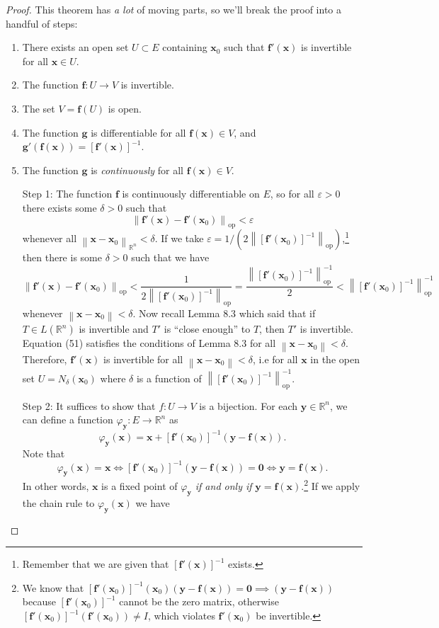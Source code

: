 \documentclass{article}
\newcommand{\R}{\mathbb{R}}
\newcommand{\x}{\mathbf{x}}
\newcommand{\f}{\mathbf{f}}
\newcommand{\y}{\mathbf{y}}
\newcommand{\ze}{\mathbf{0}}
\newcommand{\norm}[1]{\left\lVert#1\right\rVert}
\newcommand{\normop}[1]{\left\lVert#1\right\rVert_\text{op}}
\theoremstyle{definition}
\begin{document}
\begin{proof}
	This theorem has \textit{a lot} of moving parts, so we'll break the proof into a handful of steps:
	\begin{enumerate}
	\item There exists an open set $ U\subset E $ containing $ \x_0 $ such that $ \f'(\x) $ is invertible for all $ \x \in U $. 
	\item The function $ \f:U\to V $ is invertible. 
	\item The set $ V = \f(U) $ is open. 
	\item The function $ \mathbf g $ is differentiable for all $ \f(\x)\in V $, and $ \mathbf g'(\f(\x)) = [\f'(\x)]^{-1}$. 
	\item The function $ \mathbf g $ is \textit{continuously} for all $ \f(\x)\in V $. 
	\end{enumerate}
\begin{enumerate}
	\item [Step 1:]The function $ \f $ is continuously differentiable on $ E $, so for all $ \varepsilon > 0 $ there exists some $ \delta > 0 $ such that $$\normop{\f'(\x) - \f'(\x_0)} < \varepsilon$$ whenever all $ \norm{\x - \x_0}_{\R^n} < \delta $. If we take $ \varepsilon = 1/\left(2\normop{[\f'(\x_0)]^{-1}} \right)$,\footnote{Remember that we are given that $ [\f'(\x)]^{-1} $ exists.} then there is some $ \delta > 0$ such that we have 
	\begin{equation}\label{key}
		\normop{\f'(\x) - \f'(\x_0)} < \frac{1}{2\normop{[\f'(\x_0)]^{-1}}} = \frac{\normop{[\f'(\x_0)]^{-1}}^{-1}}{2} < \normop{[\f'(\x_0)]^{-1}}^{-1} 
	\end{equation} whenever $ \norm{\x - \x_0} < \delta $. Now recall Lemma 8.3 which said that if $ T\in L(\R^n) $ is invertible and $ T' $ is ``close enough'' to $ T $, then $ T' $ is invertible. Equation (51) satisfies the conditions of Lemma 8.3 for all $ \norm{\x-\x_0}<\delta $. Therefore, $ \f'(\x) $ is invertible for all $ \norm{\x-\x_0}<\delta $, i.e for all $ \x $ in the open set $U= N_\delta(\x_0) $ where $ \delta $ is a function of  $  \normop{[\f'(\x_0)]^{-1}}^{-1}   $. 
	\item [Step 2:]It suffices to show that $ f:U\to V $ is a bijection. For each $ \y\in\R^n $, we can define a function $ \varphi_\y:E\to \R^n $ as 
	$$ \varphi_\y(\x) = \x + [\f'(\x_0)]^{-1}(\y - \f(\x)) .$$ 
	Note that \begin{equation}\label{key}
		 \varphi_\y(\x) = \x \iff [\f'(\x_0)]^{-1}(\y - \f(\x)) = \ze \iff \y = \f(\x) .
	\end{equation}In other words, $ \x $ is a fixed point of $ \varphi_\y $ \textit{if and only if} $ \y = \f(\x) $.\footnote{We know that $[\f'(\x_0)]^{-1}(\x_0)(\y - \f(\x)) = \ze \implies (\y - \f(\x))$ because $ [\f'(\x_0)]^{-1} $ cannot be the zero matrix, otherwise $ [\f'(\x_0)]^{-1}(\f'(\x_0))\neq I $, which violates $ \f'(\x_0) $ be invertible.} If we apply the chain rule to $ \varphi_\y(\x) $ we have

\end{enumerate}
\end{proof}
\end{document}
